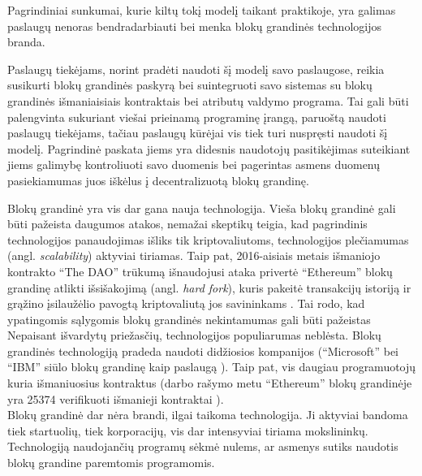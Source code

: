 Pagrindiniai sunkumai, kurie kiltų tokį modelį taikant praktikoje, yra galimas paslaugų nenoras bendradarbiauti bei menka blokų grandinės
technologijos branda.

Paslaugų tiekėjams, norint pradėti naudoti šį modelį savo paslaugose, reikia susikurti blokų grandinės paskyrą bei suintegruoti
savo sistemas su blokų grandinės išmaniaisiais kontraktais bei atributų valdymo programa.
Tai gali būti palengvinta sukuriant viešai prieinamą programinę įrangą, paruoštą naudoti paslaugų
tiekėjams, tačiau paslaugų kūrėjai vis tiek turi nuspręsti naudoti šį modelį. Pagrindinė paskata jiems yra didesnis naudotojų pasitikėjimas
suteikiant jiems galimybę kontroliuoti savo duomenis bei pagerintas asmens duomenų pasiekiamumas juos iškėlus į decentralizuotą blokų grandinę.

Blokų grandinė yra vis dar gana nauja technologija. Vieša blokų grandinė gali būti pažeista daugumos atakos, nemažai skeptikų
teigia, kad pagrindinis technologijos panaudojimas išliks tik kriptovaliutoms, technologijos plečiamumas (angl. \textit{scalability}) aktyviai
tiriamas. Taip pat, 2016-aisiais metais išmaniojo kontrakto \enquote{The DAO} trūkumą išnaudojusi ataka privertė \enquote{Ethereum} 
blokų grandinę atlikti išsišakojimą (angl. \textit{hard fork}), kuris pakeitė transakcijų istoriją ir grąžino įsilaužėlio
pavogtą kriptovaliutą jos savininkams \cite{TheDAO}. Tai rodo, kad ypatingomis sąlygomis blokų grandinės nekintamumas gali būti pažeistas\\
Nepaisant išvardytų priežasčių, technologijos populiarumas neblėsta. Blokų grandinės technologiją pradeda naudoti didžiosios kompanijos
(\enquote{Microsoft} bei \enquote{IBM} siūlo
blokų grandinę kaip paslaugą \cite{Zheng2017}). Taip pat, vis daugiau programuotojų kuria išmaniuosius kontraktus
(darbo rašymo metu \enquote{Ethereum} blokų grandinėje yra 25374 verifikuoti išmanieji kontraktai \cite{EthVerifiedContracts}).\\
Blokų grandinė dar nėra brandi, ilgai taikoma technologija. Ji aktyviai bandoma tiek startuolių, tiek
korporacijų, vis dar intensyviai tiriama mokslininkų. Technologiją naudojančių programų sėkmė nulems, ar asmenys
sutiks naudotis blokų grandine paremtomis programomis.




